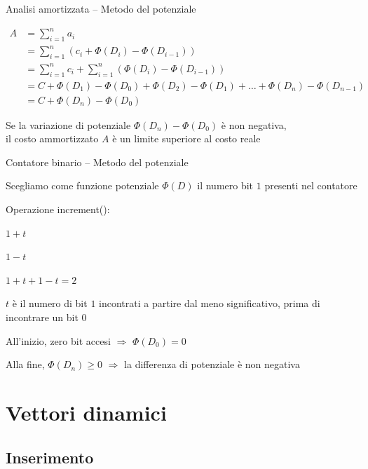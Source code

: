 \begin{frame}{Analisi amortizzata -- Metodo del potenziale}

\vspace{-3pt}
\begin{align*}
  A &= \sum_{i=1}^n a_i \\
    &= \sum_{i=1}^n \left(c_i + \Phi(D_i) - \Phi(D_{i-1}) \right) \\
    &= \sum_{i=1}^n c_i + \sum_{i=1}^n \left(\Phi(D_i) - \Phi(D_{i-1}) \right) \\
    &= C + \Phi(D_1) - \Phi(D_0) + \Phi(D_2) - \Phi(D_1) + \ldots + \Phi(D_n) - \Phi(D_{n-1}) \\
    &= C + \Phi(D_n) - \Phi(D_0)
\end{align*}

\vspace{-6pt}
Se la variazione di potenziale $\Phi(D_n) - \Phi(D_0)$ è non negativa,\\
\alert{il costo ammortizzato $A$ è un limite superiore al costo reale}
\end{frame}

\begin{frame}{Contatore binario -- Metodo del potenziale}
\BIL
\item Scegliamo come funzione potenziale $\Phi(D)$ il numero bit $1$ presenti nel contatore
\item Operazione \textsf{increment}():
\BI
  \item {} $1+t$
  \item {} $1-t$
  \item {} $1+t + 1 -t = 2$
  \item $t$ è il numero di bit $1$ incontrati a partire dal meno significativo, prima di incontrare un bit $0$
\EI
\item All'inizio, zero bit accesi $\Rightarrow$ $\Phi(D_0)  = 0$ 
\item Alla fine, $\Phi(D_n) \geq 0$  $\Rightarrow$ la differenza di potenziale è non negativa
\EIL

\end{frame}

\section{Vettori dinamici}

\subsection{Inserimento}

